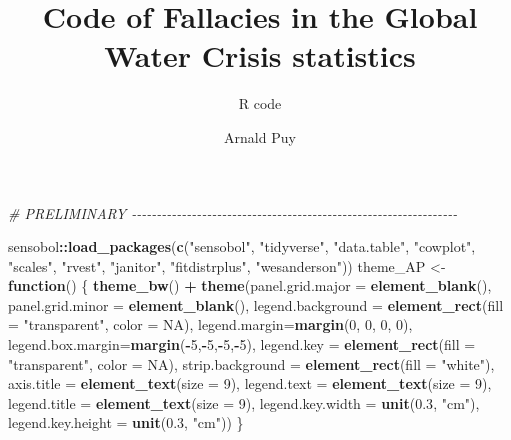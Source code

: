 \documentclass[
  11pt,
]{article}
\title{Code of Fallacies in the Global Water Crisis statistics}
\subtitle{R code}
\author{Arnald Puy}
\date{}
\newenvironment{Shaded}{\begin{snugshade}}{\end{snugshade}}
\newcommand{\AttributeTok}[1]{\textcolor[rgb]{0.13,0.29,0.53}{#1}}
\newcommand{\CommentTok}[1]{\textcolor[rgb]{0.56,0.35,0.01}{\textit{#1}}}
\newcommand{\ConstantTok}[1]{\textcolor[rgb]{0.56,0.35,0.01}{#1}}
\newcommand{\ControlFlowTok}[1]{\textcolor[rgb]{0.13,0.29,0.53}{\textbf{#1}}}
\newcommand{\DecValTok}[1]{\textcolor[rgb]{0.00,0.00,0.81}{#1}}
\newcommand{\FloatTok}[1]{\textcolor[rgb]{0.00,0.00,0.81}{#1}}
\newcommand{\FunctionTok}[1]{\textcolor[rgb]{0.13,0.29,0.53}{\textbf{#1}}}
\newcommand{\NormalTok}[1]{#1}
\newcommand{\OtherTok}[1]{\textcolor[rgb]{0.56,0.35,0.01}{#1}}
\newcommand{\SpecialCharTok}[1]{\textcolor[rgb]{0.81,0.36,0.00}{\textbf{#1}}}
\newcommand{\StringTok}[1]{\textcolor[rgb]{0.31,0.60,0.02}{#1}}
\begin{document}
\maketitle

{
\setcounter{tocdepth}{2}
\tableofcontents
}
\newpage

\begin{Shaded}
\begin{Highlighting}[]
\CommentTok{\# PRELIMINARY {-}{-}{-}{-}{-}{-}{-}{-}{-}{-}{-}{-}{-}{-}{-}{-}{-}{-}{-}{-}{-}{-}{-}{-}{-}{-}{-}{-}{-}{-}{-}{-}{-}{-}{-}{-}{-}{-}{-}{-}{-}{-}{-}{-}{-}{-}{-}{-}{-}{-}{-}{-}{-}{-}{-}{-}{-}{-}{-}{-}{-}{-}{-}{-}{-}}

\NormalTok{sensobol}\SpecialCharTok{::}\FunctionTok{load\_packages}\NormalTok{(}\FunctionTok{c}\NormalTok{(}\StringTok{"sensobol"}\NormalTok{, }\StringTok{"tidyverse"}\NormalTok{, }\StringTok{"data.table"}\NormalTok{, }\StringTok{"cowplot"}\NormalTok{, }
                          \StringTok{"scales"}\NormalTok{, }\StringTok{"rvest"}\NormalTok{, }\StringTok{"janitor"}\NormalTok{, }\StringTok{"fitdistrplus"}\NormalTok{, }\StringTok{"wesanderson"}\NormalTok{))}
\NormalTok{theme\_AP }\OtherTok{\textless{}{-}} \ControlFlowTok{function}\NormalTok{() \{}
  \FunctionTok{theme\_bw}\NormalTok{() }\SpecialCharTok{+}
    \FunctionTok{theme}\NormalTok{(}\AttributeTok{panel.grid.major =} \FunctionTok{element\_blank}\NormalTok{(),}
          \AttributeTok{panel.grid.minor =} \FunctionTok{element\_blank}\NormalTok{(),}
          \AttributeTok{legend.background =} \FunctionTok{element\_rect}\NormalTok{(}\AttributeTok{fill =} \StringTok{"transparent"}\NormalTok{,}
                                           \AttributeTok{color =} \ConstantTok{NA}\NormalTok{),}
          \AttributeTok{legend.margin=}\FunctionTok{margin}\NormalTok{(}\DecValTok{0}\NormalTok{, }\DecValTok{0}\NormalTok{, }\DecValTok{0}\NormalTok{, }\DecValTok{0}\NormalTok{),}
          \AttributeTok{legend.box.margin=}\FunctionTok{margin}\NormalTok{(}\SpecialCharTok{{-}}\DecValTok{5}\NormalTok{,}\SpecialCharTok{{-}}\DecValTok{5}\NormalTok{,}\SpecialCharTok{{-}}\DecValTok{5}\NormalTok{,}\SpecialCharTok{{-}}\DecValTok{5}\NormalTok{), }
          \AttributeTok{legend.key =} \FunctionTok{element\_rect}\NormalTok{(}\AttributeTok{fill =} \StringTok{"transparent"}\NormalTok{,}
                                    \AttributeTok{color =} \ConstantTok{NA}\NormalTok{), }
          \AttributeTok{strip.background =} \FunctionTok{element\_rect}\NormalTok{(}\AttributeTok{fill =} \StringTok{"white"}\NormalTok{), }
          \AttributeTok{axis.title =} \FunctionTok{element\_text}\NormalTok{(}\AttributeTok{size =} \DecValTok{9}\NormalTok{), }
          \AttributeTok{legend.text =} \FunctionTok{element\_text}\NormalTok{(}\AttributeTok{size =} \DecValTok{9}\NormalTok{), }
          \AttributeTok{legend.title =} \FunctionTok{element\_text}\NormalTok{(}\AttributeTok{size =} \DecValTok{9}\NormalTok{), }
          \AttributeTok{legend.key.width =} \FunctionTok{unit}\NormalTok{(}\FloatTok{0.3}\NormalTok{, }\StringTok{"cm"}\NormalTok{),}
          \AttributeTok{legend.key.height =} \FunctionTok{unit}\NormalTok{(}\FloatTok{0.3}\NormalTok{, }\StringTok{"cm"}\NormalTok{))}
\NormalTok{\}}


\end{Highlighting}
\end{Shaded}
\end{document}
